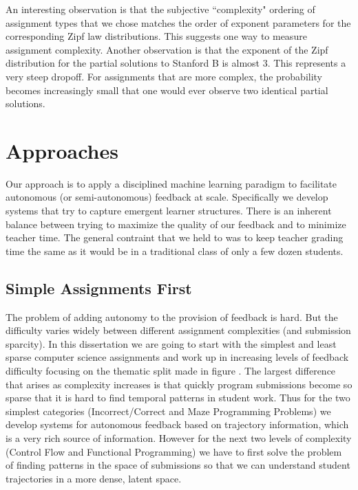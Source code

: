  An interesting observation is that the subjective ``complexity" ordering of assignment types that we chose matches the order of exponent parameters for the corresponding Zipf law distributions. This suggests one way to measure assignment complexity. Another observation is that the exponent of the Zipf distribution for the partial solutions to Stanford B is almost 3. This represents a very steep dropoff. For assignments that are more complex, the probability becomes increasingly small that one would ever observe two identical partial solutions.

\section{Approaches}

Our approach is to apply a disciplined machine learning paradigm to facilitate autonomous (or semi-autonomous) feedback at scale. Specifically we develop systems that try to capture emergent learner structures. There is an inherent balance between trying to maximize the quality of our feedback and to minimize teacher time. The general contraint that we held to was to keep teacher grading time the same as it would be in a traditional class of only a few dozen students.

\subsection{Simple Assignments First}

The problem of adding autonomy to the provision of feedback is hard. But the difficulty varies widely between different assignment complexities (and submission sparcity). In this dissertation we are going to start with the simplest and least sparse computer science assignments and work up in increasing levels of feedback difficulty focusing on the thematic split made in figure \cite{fig:assnTypes}. The largest difference that arises as complexity increases is that quickly program submissions become so sparse that it is hard to find temporal patterns in student work. Thus for the two simplest categories (Incorrect/Correct and Maze Programming Problems) we develop systems for autonomous feedback based on trajectory information, which is a very rich source of information. However for the next two levels of complexity (Control Flow and Functional Programming) we have to first solve the problem of finding patterns in the space of submissions so that we can understand student trajectories in a more dense, latent space. 


